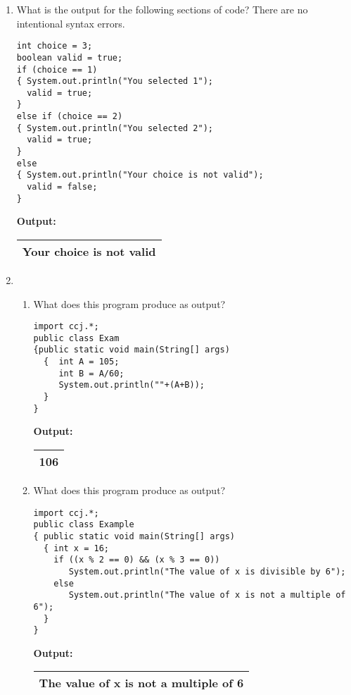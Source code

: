 \begin{enumerate}
\begin{enumerate}
\end{enumerate}

    \item What is the output for the following sections of code?
    There are no intentional syntax errors.
\begin{verbatim}
int choice = 3;
boolean valid = true;
if (choice == 1)
{ System.out.println("You selected 1");
  valid = true;
}
else if (choice == 2)
{ System.out.println("You selected 2");
  valid = true;
}
else
{ System.out.println("Your choice is not valid");
  valid = false;
}

\end{verbatim}

        {\bf Output:}
        \begin{tabular}{|c|}
            \hline
            Your choice is not valid\\
           
            \hline
        \end{tabular}

\smallskip



\item
    \begin{enumerate}\item What does this program produce as output?
\begin{verbatim}
import ccj.*;
public class Exam
{public static void main(String[] args)
  {  int A = 105;
     int B = A/60;
     System.out.println(""+(A+B));
  }
}
\end{verbatim}

\smallskip
\smallskip
        {\bf Output:}
        \begin{tabular}{|c|}
            \hline
            106\\
            \hline
        \end{tabular}

\smallskip
\smallskip

\item What does this program produce as output?
\begin{verbatim}
import ccj.*;
public class Example
{ public static void main(String[] args)
  { int x = 16;
    if ((x % 2 == 0) && (x % 3 == 0))
       System.out.println("The value of x is divisible by 6");
    else
       System.out.println("The value of x is not a multiple of 6");
  }
}
\end{verbatim}

        {\bf Output:}
        \begin{tabular}{|c|}
            \hline
            The value of x is not a multiple of 6\\
            \hline
        \end{tabular}
\end{enumerate}


\end{enumerate}
